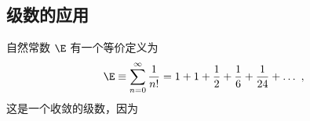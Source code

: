 
\subsection{级数的应用}



自然常数 $\E$ 有一个等价定义为
\begin{equation}
\E \equiv \sum_{n=0}^\infty \frac{1}{n!} = 1 + 1 + \frac{1}{2} + \frac{1}{6} + \frac{1}{24} +\dots~,
\end{equation}
这是一个收敛的级数，因为
